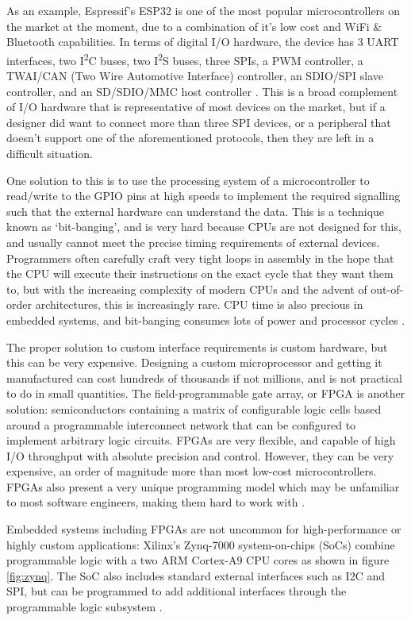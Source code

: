 As an example, Espressif's ESP32 is one of the most popular microcontrollers on the market at the moment, due to a combination of it's low cost and WiFi \& Bluetooth capabilities. In terms of digital I/O hardware, the device has 3 UART interfaces, two I\textsuperscript{2}C buses, two I\textsuperscript{2}S buses, three SPIs, a PWM controller, a TWAI/CAN (Two Wire Automotive Interface) controller, an SDIO/SPI slave controller, and an SD/SDIO/MMC host controller \cite{esp32}. This is a broad complement of I/O hardware that is representative of most devices on the market, but if a designer did want to connect more than three SPI devices, or a peripheral that doesn't support one of the aforementioned protocols, then they are left in a difficult situation.

One solution to this is to use the processing system of a microcontroller to read/write to the GPIO pins at high speeds to implement the required signalling such that the external hardware can understand the data. This is a technique known as `bit-banging', and is very hard because CPUs are not designed for this, and usually cannot meet the precise timing requirements of external devices. Programmers often carefully craft very tight loops in assembly in the hope that the CPU will execute their instructions on the exact cycle that they want them to, but with the increasing complexity of modern CPUs and the advent of out-of-order architectures, this is increasingly rare. CPU time is also precious in embedded systems, and bit-banging consumes lots of power and processor cycles \cite{bitbang}.

The proper solution to custom interface requirements is custom hardware, but this can be very expensive. Designing a custom microprocessor and getting it manufactured can cost hundreds of thousands if not millions, and is not practical to do in small quantities. The field-programmable gate array, or FPGA is another solution: semiconductors containing a matrix of configurable logic cells based around a programmable interconnect network that can be configured to implement arbitrary logic circuits. FPGAs are very flexible, and capable of high I/O throughput with absolute precision and control. However, they can be very expensive, an order of magnitude more than most low-cost microcontrollers. FPGAs also present a very unique programming model which may be unfamiliar to most software engineers, making them hard to work with \cite{whatisfpga}.

Embedded systems including FPGAs are not uncommon for high-performance or highly custom applications: Xilinx's Zynq-7000 system-on-chips (SoCs) combine programmable logic with a two ARM Cortex-A9 CPU cores as shown in figure \ref{fig:zynq}. The SoC also includes standard external interfaces such as I2C and SPI, but can be programmed to add additional interfaces through the programmable logic subsystem \cite{zynq}.

